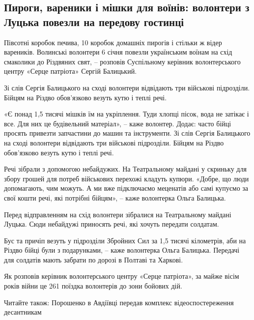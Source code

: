  
 
 
 
 
\subsection{Пироги, вареники і мішки для воїнів: волонтери з Луцька повезли на передову гостинці}
\label{sec:07_01_2022.stz.news.ua.volyn.1.peredovaja_podarki_soldaty}


Півсотні коробок печива, 10 коробок домашніх пирогів і стільки ж відер
вареників. Волинські волонтери 6 січня повезли українським воїнам на схід
смаколики до Різдвяних свят, – розповів Суспільному керівник волонтерського
центру «Серце патріота» Сергій Балицький.

\begin{zznagolos}
Зі слів Сергія Балицького на сході волонтери відвідають три військові
підрозділи. Бійцям на Різдво обов'язково везуть кутю і теплі речі.	
\end{zznagolos}

«Є понад 1,5 тисячі мішків їм на укріплення. Туди хлопці пісок, вода не затікає
і все. Для них це будівельний матеріал», – каже волонтер. Додає: часто бійці
просять привезти запчастини до машин та інструменти. Зі слів Сергія Балицького
на сході волонтери відвідають три військові підрозділи. Бійцям на Різдво
обов'язково везуть кутю і теплі речі.


Речі зібрали з допомогою небайдужих. На Театральному майдані у скриньку для
збору грошей для потреб військових перехожі кладуть купюри. «Добре, що люди
допомагають, чим можуть. А ми вже підключаємо меценатів або самі купуємо за
свої кошти речі, які потрібні бійцям», – каже волонтерка Ольга Балицька.

Перед відправленням на схід волонтери зібралися на Театральному майдані Луцька.
Сюди небайдужі приносять речі, які хочуть передати солдатам.

Бус та причіп везуть у підрозділи Збройних Сил за 1,5 тисячі кілометрів, аби на
Різдво бійці були з подарунками, – каже волонтерка Ольга Балицька. Передачі для
солдатів мають забрати по дорозі в Полтаві та Харкові.

Як розповів керівник волонтерського центру «Серце патріота», за майже вісім
років війни це 261 поїздка волонтерів до зони бойових дій.

Читайте також: Порошенко в Авдіївці передав комплекс відеоспостереження
десантникам
